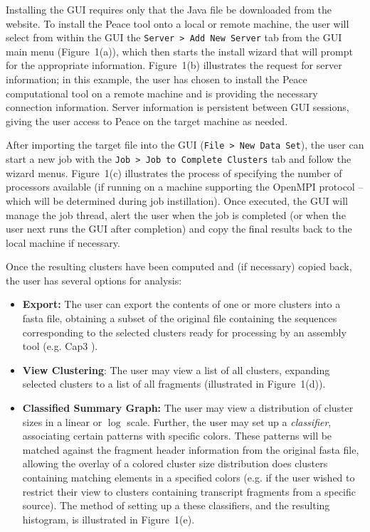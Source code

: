 \documentclass[a4,center,fleqn]{NAR}
\begin{document}
 Installing the GUI requires only
that the Java file be downloaded from the website.  To install the {\sc
  Peace} tool onto a local or remote machine, the user will select
from within the GUI the {\tt Server > Add New Server} tab from the GUI
main menu (Figure~1(a)), which then starts the install
wizard that will prompt for the appropriate information.
Figure~1(b) illustrates the request for server information;
in this example, the user has chosen to install the {\sc Peace}
computational tool on a remote machine and is providing the necessary
connection information.  Server information is persistent between GUI
sessions, giving the user access to {\sc Peace} on the target machine
as needed.

 After importing the target file into
the GUI ({\tt File > New Data Set}), the user can start a new job with
the {\tt Job > Job to Complete Clusters} tab and follow the wizard
menus.  Figure~1(c) illustrates the process of specifying
the number of processors available (if running on a machine supporting
the OpenMPI protocol -- which will be determined during job
instillation).  Once executed, the GUI will manage the job thread,
alert the user when the job is completed (or when the user next
runs the GUI after completion) and 
copy the final results back to the local machine if necessary.

 Once the resulting clusters have been
computed and (if necessary) copied back, the user has several options
for analysis:
\begin{itemize}
\item {\bf Export:} The user can export the contents of one or more
  clusters into a fasta file, obtaining a subset of the original file
  containing the sequences corresponding to the selected clusters
  ready for processing by an assembly tool (e.g. {\sc Cap3} \cite{Huang99}).
\item {\bf View Clustering}: The user may view a list of all clusters,
  expanding selected clusters to a list of all fragments (illustrated in
  Figure~1(d)).  
\item {\bf Classified Summary Graph:} The user may view a distribution
  of cluster sizes in a linear or $\log$ scale.  Further, the user may
  set up a {\it classifier}, associating certain patterns with
  specific colors.  These patterns will be matched against the fragment
  header information from the original fasta file, allowing the overlay of
  a colored cluster size distribution does clusters containing matching elements in a
  specified colors (e.g. if the user wished to restrict their view to
  clusters containing transcript fragments from a specific source).  The method of
  setting up a these classifiers, and the resulting histogram, is
  illustrated in Figure~1(e).
\end{itemize}
\end{document}
